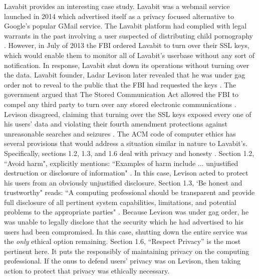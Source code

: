 \documentclass{article}
\begin{document}
  Lavabit provides an interesting case study.  Lavabit was a webmail service
  launched in 2014 which advertised itself as a privacy focused alternative to
  Google's popular GMail service.  The Lavabit platform had complied with legal
  warrants in the past involving a user suspected of distributing child
  pornography \cite{LavabitWarrent}.  However, in July of 2013 the FBI ordered
  Lavabit to turn over their SSL keys, which would enable them to monitor all
  of Lavabit's userbase without any sort of notification.  In response, Lavabit
  shut down its operations without turning over the data.  Lavabit founder, 
  Ladar Levison later revealed that he was under gag order not to reveal to the
  public that the FBI had requested the keys \cite{Mullin}.  The government
  argued that The Stored Communication Act allowed the FBI to compel any third
  party to turn over any stored electronic communications \cite{Lavabit}. 
  Levison disagreed, claiming that turning over the SSL keys exposed every one
  of his users' data and violating their fourth amendment protections against
  unreasonable searches and seizures \cite{Lavabit}.  The ACM code of computer
  ethics has several provisions that would address a situation similar in
  nature to Lavabit's.  Specifically, sections 1.2, 1.3, and 1.6 deal with
  privacy and honesty \cite{ACM}.  Section 1.2, ``Avoid harm", explicitly
  mentions: ``Examples of harm include ... unjustified destruction or disclosure
  of information" \cite{ACM}.  In this case, Levison acted to protect his users
  from an obviously unjustified disclosure.  Section 1.3, `Be honest and
  trustworthy" reads: ``A computing professional should be transparent and 
  provide full disclosure of all pertinent system capabilities, limitations, 
  and potential problems to the appropriate parties" \cite{ACM}.  Because
  Levison was under gag order, he was unable to legally disclose that the
  security which he had advertised to his users had been compromised.  In this
  case, shutting down the entire service was the \emph{only} ethical option
  remaining.  Section 1.6, ``Respect Privacy'' is the most pertinent here.  It
  puts the responsibly of maintaining privacy on the computing professional.
  If the onus to defend users' privacy was on Levison, then taking action to
  protect that privacy was ethically necessary.
\end{document}
